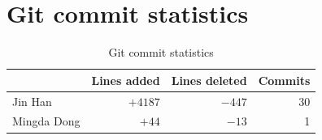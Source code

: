 \documentclass[12pt,a4paper]{article}
\begin{document}



\appendix
\appendixpage
\section{Git commit statistics}

\begin{table}[ht]
    \centering
    \begin{tabular}{l|rrr}
        & \textbf{Lines added} & \textbf{Lines deleted} & \textbf{Commits} \\ \hline
        Jin Han & $+4187$ & $-447$ & 30 \\ \hline
        Mingda Dong & $+44$ & $-13$ & 1
    \end{tabular}
    \caption{Git commit statistics}
\end{table}
\end{document}
